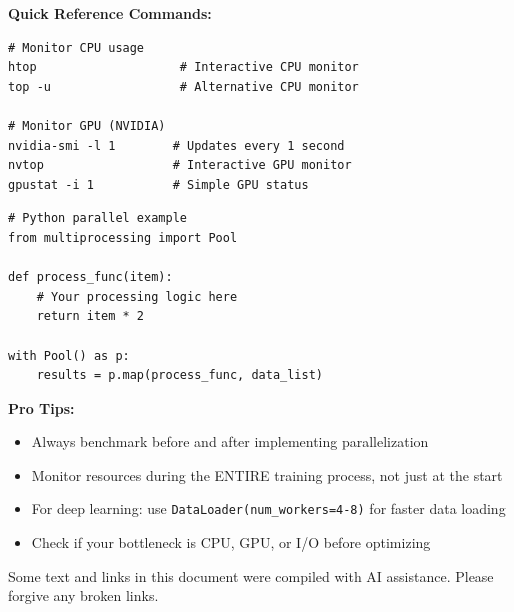 \documentclass[11pt,a4paper]{article}
\begin{document}
\textbf{Quick Reference Commands:}

\begin{lstlisting}[style=bashstyle, caption=System Monitoring Commands]
# Monitor CPU usage
htop                    # Interactive CPU monitor
top -u                  # Alternative CPU monitor

# Monitor GPU (NVIDIA)
nvidia-smi -l 1        # Updates every 1 second
nvtop                  # Interactive GPU monitor
gpustat -i 1           # Simple GPU status
\end{lstlisting}

\begin{lstlisting}[style=pythonstyle, caption=Python Parallel Processing Example]
# Python parallel example
from multiprocessing import Pool

def process_func(item):
    # Your processing logic here
    return item * 2

with Pool() as p:
    results = p.map(process_func, data_list)
\end{lstlisting}

\textbf{Pro Tips:}
\begin{itemize}
    \item Always benchmark before and after implementing parallelization
    \item Monitor resources during the ENTIRE training process, not just at the start
    \item For deep learning: use \texttt{DataLoader(num\_workers=4-8)} for faster data loading
    \item Check if your bottleneck is CPU, GPU, or I/O before optimizing
\end{itemize}

\vspace{1cm}
\begin{tcolorbox}[colback=gray!10,colframe=gray!50,title=AI Disclosure]
Some text and links in this document were compiled with AI assistance. Please forgive any broken links.
\end{tcolorbox}
\end{document}

